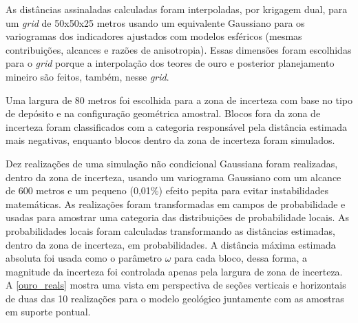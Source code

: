 \begin{figure}[H]
\end{figure}

As distâncias assinaladas calculadas foram interpoladas, por krigagem dual, para um \textit{grid} de 50x50x25 metros usando um equivalente Gaussiano para os variogramas dos indicadores ajustados com modelos esféricos (mesmas contribuições, alcances e razões de anisotropia). Essas dimensões foram escolhidas para o \textit{grid} porque a interpolação dos teores de ouro e posterior planejamento mineiro são feitos, também, nesse \textit{grid}.

Uma largura de 80 metros foi escolhida para a zona de incerteza com base no tipo de depósito e na configuração geométrica amostral. Blocos fora da zona de incerteza foram classificados com a categoria responsável pela distância estimada mais negativas, enquanto blocos dentro da zona de incerteza foram simulados.

Dez realizações de uma simulação não condicional Gaussiana foram realizadas, dentro da zona de incerteza, usando um variograma Gaussiano com um alcance de 600 metros e um pequeno (0,01\%) efeito pepita para evitar instabilidades matemáticas. As realizações foram transformadas em campos de probabilidade e usadas para amostrar uma categoria das distribuições de probabilidade locais. As probabilidades locais foram calculadas transformando as distâncias estimadas, dentro da zona de incerteza, em probabilidades. A distância máxima estimada absoluta foi usada como o parâmetro $\omega$ para cada bloco, dessa forma, a magnitude da incerteza foi controlada apenas pela largura de zona de incerteza. A \autoref{ouro_reals} mostra uma vista em perspectiva de seções verticais e horizontais de duas das 10 realizações para o modelo geológico juntamente com as amostras em suporte pontual.

